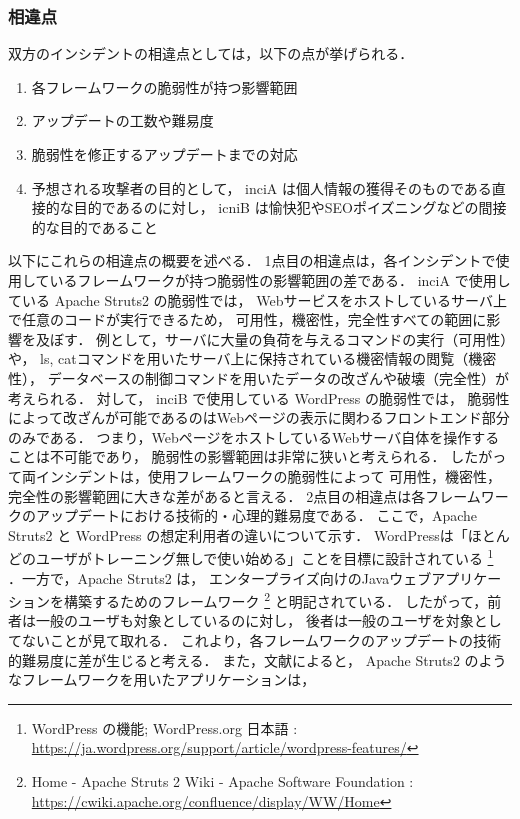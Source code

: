 \documentclass[uplatex]{jsarticle}
\begin{document}
\subsubsection*{相違点}
双方のインシデントの相違点としては，以下の点が挙げられる．
\begin{enumerate}
    \item 各フレームワークの脆弱性が持つ影響範囲
    \item アップデートの工数や難易度
    \item 脆弱性を修正するアップデートまでの対応
    \item 予想される攻撃者の目的として，
    inciA は個人情報の獲得そのものである直接的な目的であるのに対し，
    icniB は愉快犯やSEOポイズニングなどの間接的な目的であること
\end{enumerate}
以下にこれらの相違点の概要を述べる．
1点目の相違点は，各インシデントで使用しているフレームワークが持つ脆弱性の影響範囲の差である．
inciA で使用している Apache Struts2 の脆弱性では，
Webサービスをホストしているサーバ上で任意のコードが実行できるため，
可用性，機密性，完全性すべての範囲に影響を及ぼす．
例として，サーバに大量の負荷を与えるコマンドの実行（可用性）や，
ls, catコマンドを用いたサーバ上に保持されている機密情報の閲覧（機密性），
データベースの制御コマンドを用いたデータの改ざんや破壊（完全性）が考えられる．
対して， inciB で使用している WordPress の脆弱性では，
脆弱性によって改ざんが可能であるのはWebページの表示に関わるフロントエンド部分のみである．
つまり，WebページをホストしているWebサーバ自体を操作することは不可能であり，
脆弱性の影響範囲は非常に狭いと考えられる．
したがって両インシデントは，使用フレームワークの脆弱性によって
可用性，機密性，完全性の影響範囲に大きな差があると言える．
2点目の相違点は各フレームワークのアップデートにおける技術的・心理的難易度である．
ここで，Apache Struts2 と WordPress の想定利用者の違いについて示す．
WordPressは「ほとんどのユーザがトレーニング無しで使い始める」ことを目標に設計されている
\footnote{
    WordPress の機能; WordPress.org 日本語
    : \url{https://ja.wordpress.org/support/article/wordpress-features/}
}
．一方で，Apache Struts2 は，
エンタープライズ向けのJavaウェブアプリケーションを構築するためのフレームワーク
\footnote{
    Home - Apache Struts 2 Wiki - Apache Software Foundation
    : \url{https://cwiki.apache.org/confluence/display/WW/Home}
}
と明記されている．
したがって，前者は一般のユーザも対象としているのに対し，
後者は一般のユーザを対象としてないことが見て取れる．
これより，各フレームワークのアップデートの技術的難易度に差が生じると考える．
また，文献\cite{Bavota2015}によると，
Apache Struts2 のようなフレームワークを用いたアプリケーションは，
\end{document}

